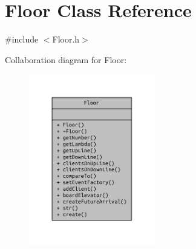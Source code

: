 \section{Floor Class Reference}
\label{class_floor}


{\ttfamily \#include $<$Floor.\+h$>$}



Collaboration diagram for Floor\+:
\nopagebreak
\begin{figure}[H]
\begin{center}
\leavevmode
\includegraphics[width=156pt]{class_floor__coll__graph}
\end{center}
\end{figure}
